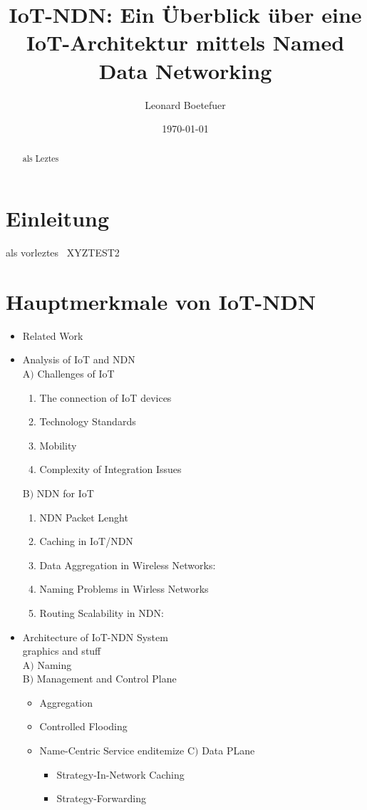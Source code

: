 \documentclass[a4paper,12pt]{article}
\title{IoT-NDN: Ein Überblick über eine IoT-Architektur mittels Named Data Networking}
\author{Leonard Boetefuer}
\date{\today}
\begin{document}
\maketitle

\begin{abstract}
als Leztes
\end{abstract}

\section{Einleitung}
als vorleztes
\
XYZTEST2
\section{Hauptmerkmale von IoT-NDN}
\begin{itemize}
\item Related Work
\item Analysis of IoT and NDN\\
    A$)$ Challenges of IoT\\
    \begin{enumerate}
        \item The connection of IoT devices
        \item Technology Standards
        \item Mobility
        \item Complexity of Integration Issues
    \end{enumerate}
    B$)$ NDN for IoT\\
    \begin{enumerate}
        \item NDN Packet Lenght
        \item Caching in IoT/NDN
        \item Data Aggregation in Wireless Networks:
        \item Naming Problems in Wirless Networks
        \item Routing Scalability in NDN:
    \end{enumerate}
\item Architecture of IoT-NDN System\\
    graphics and stuff\\
    A$)$ Naming\\
    B$)$ Management and Control Plane\\
    \begin{itemize}
        \item Aggregation
        \item Controlled Flooding
        \item Name-Centric Service
    end{itemize}
    C$)$ Data PLane\\
    \begin{itemize}
        \item Strategy-In-Network Caching
        \item Strategy-Forwarding
    \end{itemize}
    

\end{itemize}
\end{itemize}
\end{document}
